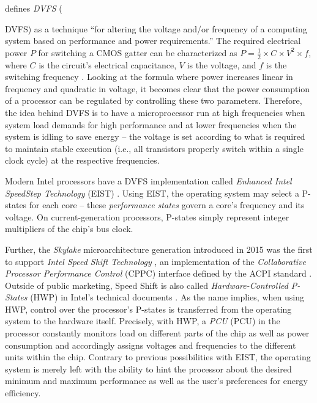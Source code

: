 \citeauthor{mittal2014survey} \cite{mittal2014survey} defines \textit{\acrlong{DVFS}} ({\acrshort{DVFS}) as a technique \enquote{for altering the voltage and/or frequency of a computing system based on performance and power requirements.} The required electrical power $P$ for switching a \gls{CMOS} gatter can be characterized as $P=\frac{1}{2} \times C \times V^2 \times f$, where $C$ is the circuit's electrical capacitance, $V$ is the voltage, and $f$ is the switching frequency \cite{Hennessy:2017:CAS:3207796}. Looking at the formula where power increases linear in frequency and quadratic in voltage, it becomes clear that the power consumption of a processor can be regulated by controlling these two parameters. Therefore, the idea behind \gls{DVFS} is to have a microprocessor run at high frequencies when system load demands for high performance and at lower frequencies when the system is idling to save energy -- the voltage is set according to what is required to maintain stable execution (i.e., all transistors properly switch within a single clock cycle) at the respective frequencies.

Modern Intel processors have a \gls{DVFS} implementation called \emph{Enhanced Intel SpeedStep Technology} (EIST) \cite{intelsdmsysprogguide}. Using EIST, the operating system may select a \glspl{P-state} for each core -- these \emph{performance states} govern a core's frequency and its voltage. On current-generation processors, \glspl{P-state} simply represent integer multipliers of the chip's bus clock.

Further, the \textit{Skylake} microarchitecture generation introduced in 2015 was the first to support \emph{Intel Speed Shift Technology} \cite{intelsykalekannouncement}, an implementation of the \emph{Collaborative Processor Performance Control} (CPPC) interface defined by the \gls{ACPI} standard \cite{acpispec}. Outside of public marketing, Speed Shift is also called \emph{Hardware-Controlled P-States} (HWP) in Intel's technical documents \cite{intelsdmsysprogguide}. As the name implies, when using HWP, control over the processor's \glspl{P-state} is transferred from the operating system to the hardware itself. Precisely, with \gls{HWP}, a \textit{\acrlong{PCU}} (\acrshort{PCU}) in the processor constantly monitors load on different parts of the chip as well as power consumption and accordingly assigns voltages and frequencies to the different units within the chip. Contrary to previous possibilities with EIST, the operating system is merely left with the ability to hint the processor about the desired minimum and maximum performance as well as the user's preferences for energy efficiency.

}
